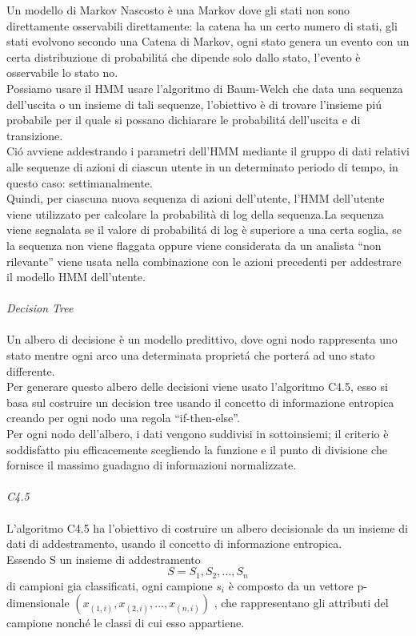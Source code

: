 \documentclass[../tesi.tex]{subfiles}
\begin{document}
Un modello di Markov Nascosto è una \Gls{Markov} dove gli stati non sono direttamente osservabili direttamente: la catena ha un certo numero di stati, gli stati evolvono secondo una Catena di Markov, ogni stato genera un evento con un certa distribuzione di probabilitá che dipende solo dallo stato, l’evento è osservabile lo stato no.\\
Possiamo usare il HMM usare l’algoritmo di Baum-Welch che data una sequenza dell’uscita o un insieme di tali sequenze, l’obiettivo è di trovare l’insieme piú probabile per il quale si possano dichiarare le probabilitá dell’uscita e di transizione.\\
Ció avviene addestrando i parametri dell’HMM mediante il gruppo di dati relativi alle sequenze di azioni di ciascun utente in un determinato periodo di tempo, in questo caso: settimanalmente.\\
Quindi, per ciascuna nuova sequenza di azioni dell'utente, l'HMM dell'utente viene utilizzato per calcolare la probabilità di log della sequenza.La sequenza viene segnalata se il valore di probabilitá di log è superiore a una certa soglia, se la sequenza non viene flaggata oppure viene considerata da un analista “non rilevante” viene usata nella combinazione con le azioni precedenti per addestrare il modello HMM dell’utente.\\
\\
\textit{Decision Tree}\\
\\
Un albero di decisione è un modello predittivo, dove ogni nodo rappresenta uno stato mentre ogni arco una determinata proprietá che porterá ad uno stato differente.\\
Per generare questo albero delle decisioni viene usato l’algoritmo C4.5, esso si basa sul costruire un decision tree usando il concetto di informazione entropica creando per ogni nodo una regola “if-then-else”.\\
Per ogni nodo dell’albero, i dati vengono suddivisi in sottoinsiemi; il criterio è soddisfatto piu efficacemente scegliendo la funzione e il punto di divisione che fornisce il massimo guadagno di informazioni normalizzate.\\
\\
\textit{C4.5}\\
\\
L’algoritmo C4.5 ha l’obiettivo di costruire un  albero decisionale da un insieme di dati di addestramento, usando il concetto di informazione entropica.\\
Essendo S un insieme di addestramento $$ S = S_1 ,S_2,…,S_n$$  di campioni gia classificati, ogni campione $s_i$ è composto da un vettore p-dimensionale $(x_{(1,i)}  ,x_{(2,i)}, … , x_{(n,i)} )$ , che rappresentano gli attributi del campione nonché le classi di cui esso appartiene.\\
\end{document}
